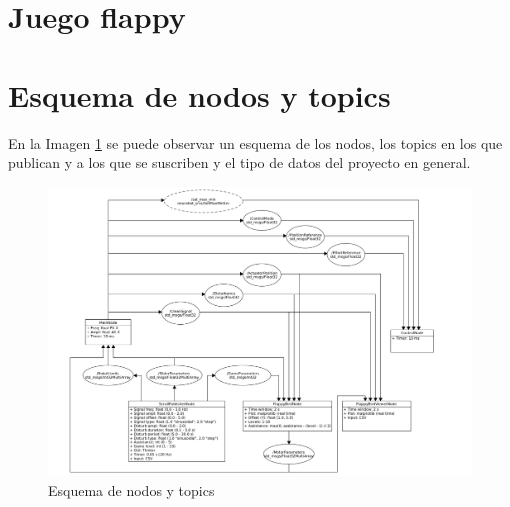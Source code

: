 \section{Juego flappy}

\section{Esquema de nodos y topics}

En la Imagen \ref{fig:nodes} se puede observar un esquema de los nodos, los topics en los que publican y a los que se suscriben y el tipo de datos del proyecto en general. 

\begin{figure}[ht!]
	\centering
	\begin{minipage}{1.15\linewidth}
		\centering
		\includegraphics[width=\linewidth]{figs/esquema_nodos.png}
	\end{minipage}
	\caption[Esquema de nodos y topics]{Esquema de nodos y topics}
	\label{fig:nodes}
\end{figure}
